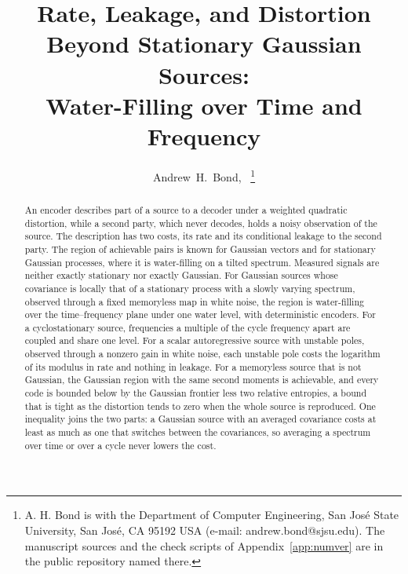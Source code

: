 \documentclass[11pt,onecolumn]{IEEEtran}
\begin{document}
\title{Rate, Leakage, and Distortion Beyond Stationary Gaussian Sources:\\ Water-Filling over Time and Frequency}

\author{Andrew~H.~Bond,~%
\thanks{A. H. Bond is with the Department of Computer Engineering, San Jos\'e
State University, San Jos\'e, CA 95192 USA (e-mail: andrew.bond@sjsu.edu).
The manuscript sources and the check scripts of
Appendix~\ref{app:numver} are in the public repository named there.}}


\maketitle

\begin{abstract}
An encoder describes part of a source to a decoder under a weighted
quadratic distortion, while a second party, which never decodes, holds
a noisy observation of the source. The description has two costs, its
rate and its conditional leakage to the second party. The region of
achievable pairs is known for Gaussian vectors and for stationary
Gaussian processes, where it is water-filling on a tilted spectrum.
Measured signals are neither exactly stationary nor exactly Gaussian.
For Gaussian sources whose covariance is locally that of a stationary
process with a slowly varying spectrum, observed through a fixed
memoryless map in white noise, the region is water-filling over the
time--frequency plane under one water level, with deterministic
encoders. For a cyclostationary source, frequencies a multiple of the
cycle frequency apart are coupled and share one level. For a scalar
autoregressive source with unstable poles, observed through a nonzero
gain in white noise, each unstable pole costs the logarithm of its
modulus in rate and nothing in leakage. For a memoryless source that
is not Gaussian, the Gaussian region with the same second moments is
achievable, and every code is bounded below by the Gaussian frontier
less two relative entropies, a bound that is tight as the distortion
tends to zero when the whole source is reproduced. One inequality joins
the two parts: a Gaussian source with an averaged covariance costs at
least as much as one that switches between the covariances, so
averaging a spectrum over time or over a cycle never lowers the cost.
\end{abstract}
\end{document}
